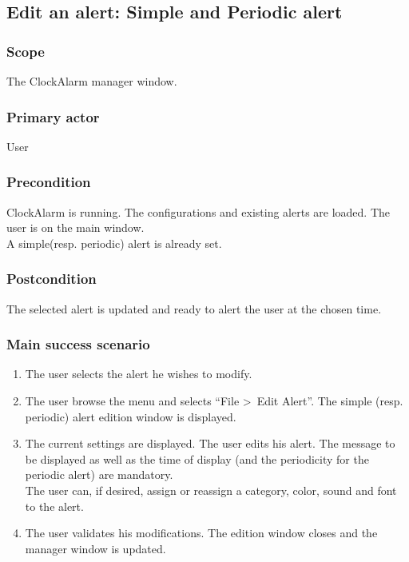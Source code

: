 \subsection{Edit an alert: Simple and Periodic alert}

\subsubsection{Scope}
The ClockAlarm manager window.
\subsubsection{Primary actor}
User
\subsubsection{Precondition}
ClockAlarm is running. The configurations and existing alerts are loaded. The user is on the main window.
\\A simple(resp. periodic) alert is already set.
\subsubsection{Postcondition}
The selected alert is updated and ready to alert the user at the chosen time.
\subsubsection{Main success scenario}
\begin{enumerate}
	\item The user selects the alert he wishes to modify.
	\item \label{itm:ucae_edit_spa} The user browse the menu and selects ``File \textgreater~Edit Alert''. The simple (resp. periodic) alert edition window is displayed. 
	\item \label{itm:ucae_enter_spa} The current settings are displayed. The user edits his alert. The message to be displayed as well as the time of display (and the periodicity for the periodic alert) are mandatory. \\The user can, if desired, assign or reassign a category, color, sound and font to the alert.
	\item \label{itm:ucae_validate_spa} The user validates his modifications. The edition window closes and the manager window is updated.
\end{enumerate}
